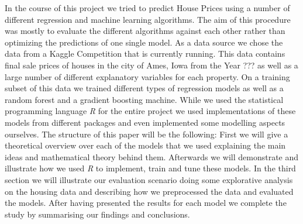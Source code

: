 In the course of this project we tried to predict House Prices using a number of different regression and machine learning algorithms. The aim of this procedure was mostly to evaluate the different algorithms against each other rather than optimizing the predictions of one single model. As a data source we chose the data from a Kaggle Competition that is currently running. This data contains final sale prices of houses in the city of Ames, Iowa from the Year ??? as well as a large number of different explanatory variables for each property. On a training subset of this data we trained different types of regression models as well as a random forest and a gradient boosting machine. While we used the statistical programming language \textit{R} for the entire project we used implementations of these models from different packages and even implemented some modelling aspects ourselves. The structure of this paper will be the following: First we will give a theoretical overview over each of the models that we used explaining the main ideas and mathematical theory behind them. Afterwards we will demonstrate and illustrate how we used \textit{R} to implement, train and tune these models. In the third section we will illustrate our evaluation scenario doing some explorative analysis on the housing data and describing how we preprocessed the data and evaluated the models. After having presented the results for each model we complete the study by summarising our findings and conclusions. 